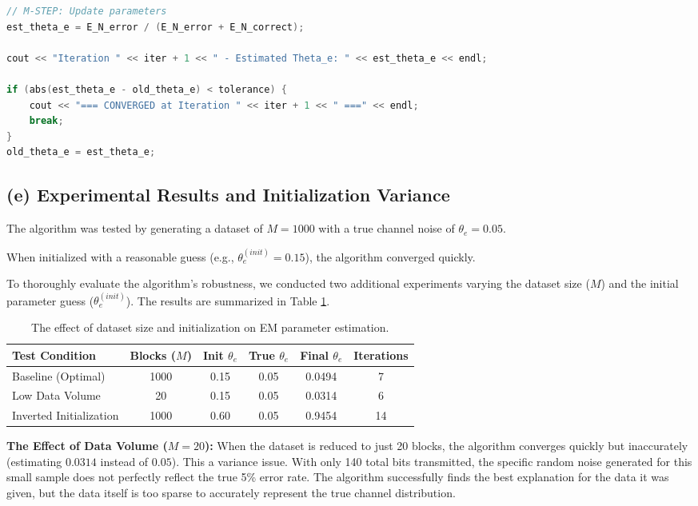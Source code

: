 \documentclass{article}
\begin{document}
\begin{lstlisting}[language=C++]
// M-STEP: Update parameters
est_theta_e = E_N_error / (E_N_error + E_N_correct);

cout << "Iteration " << iter + 1 << " - Estimated Theta_e: " << est_theta_e << endl;

if (abs(est_theta_e - old_theta_e) < tolerance) {
    cout << "=== CONVERGED at Iteration " << iter + 1 << " ===" << endl;
    break;
}
old_theta_e = est_theta_e;
\end{lstlisting}

\subsection{(e) Experimental Results and Initialization Variance}
The algorithm was tested by generating a dataset of $M=1000$  with a true channel noise of $\theta_e = 0.05$. 

When initialized with a reasonable guess (e.g., $\theta_e^{(init)} = 0.15$), the algorithm converged quickly.

To thoroughly evaluate the algorithm's robustness, we conducted two additional experiments varying the dataset size ($M$) and the initial parameter guess ($\theta_e^{(init)}$). The results are summarized in Table \ref{tab:q2_experiments}.

\begin{table}[H]
\centering
\begin{tabular}{|l|c|c|c|c|c|}
\hline
\textbf{Test Condition} & \textbf{Blocks ($M$)} & \textbf{Init $\theta_e$} & \textbf{True $\theta_e$} & \textbf{Final $\theta_e$} & \textbf{Iterations} \\ \hline
Baseline (Optimal) & 1000 & 0.15 & 0.05 & 0.0494 & 7 \\ \hline
Low Data Volume & 20 & 0.15 & 0.05 & 0.0314 & 6 \\ \hline
Inverted Initialization & 1000 & 0.60 & 0.05 & 0.9454 & 14 \\ \hline
\end{tabular}
\caption{The effect of dataset size and initialization on EM parameter estimation.}
\label{tab:q2_experiments}
\end{table}

\textbf{The Effect of Data Volume ($M = 20$):} 
When the dataset is reduced to just 20 blocks, the algorithm converges quickly but inaccurately (estimating $0.0314$ instead of $0.05$). This a variance issue. With only 140 total bits transmitted, the specific random noise generated for this small sample does not perfectly reflect the true 5\% error rate. The algorithm successfully finds the best explanation for the data it was given, but the data itself is too sparse to accurately represent the true channel distribution.
\end{document}

